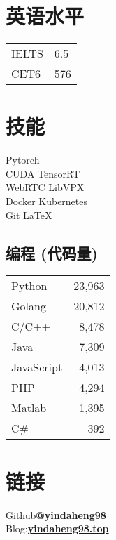 \documentclass[]{deedy-resume-openfont}
\begin{document}
\begin{minipage}[t]{0.21\textwidth}
	\section{英语水平}
	\begin{tabular}{ll}
		IELTS & 6.5 \\
		CET6  & 576 \\
	\end{tabular}
	\sectionsep

	\section{技能}
	Pytorch \\
	CUDA \textbullet{} TensorRT \\
	WebRTC \textbullet{} LibVPX \\
	Docker \textbullet{} Kubernetes \\
	Git \textbullet{} \LaTeX \textbullet{} \\
	\sectionsep

	\subsection{编程 {\small (代码量)}}
	\begin{tabular}{lr}
		Python     & 23,963 \\ %
		Golang 	   & 20,812 \\ %
		C/C++      & 8,478  \\ %
		Java       & 7,309  \\ %
		JavaScript & 4,013  \\ %
		PHP        & 4,294  \\ %
		Matlab     & 1,395  \\ %
		C\#        & 392    \\ %
	\end{tabular}
	\sectionsep
    

	\section{链接}
	Github\href{https://github.com/yindaheng98}{\bf @yindaheng98} \\
	Blog:\href{http://www.yindaheng98.top}{\bf yindaheng98.top} \\
	\sectionsep


\end{minipage}
\end{document}
